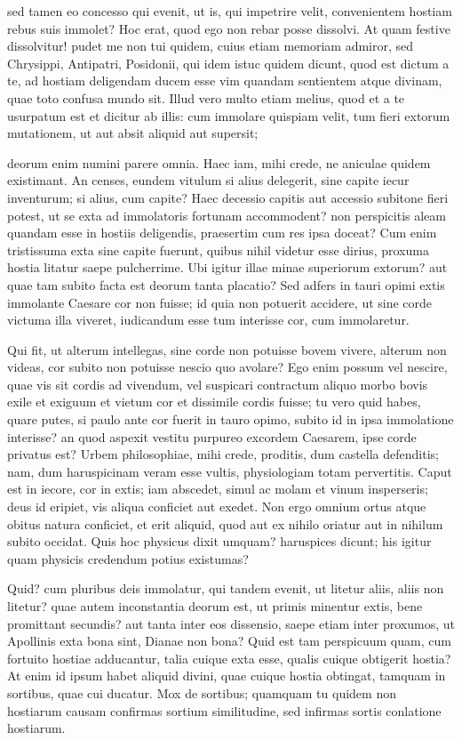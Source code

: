  sed tamen eo concesso qui evenit, ut is, qui impetrire velit, convenientem hostiam rebus suis immolet? Hoc erat, quod ego non rebar posse dissolvi. At quam festive dissolvitur! pudet me non tui quidem, cuius etiam memoriam admiror, sed Chrysippi, Antipatri, Posidonii, qui idem istuc quidem dicunt, quod est dictum a te, ad hostiam deligendam ducem esse vim quandam sentientem atque divinam, quae toto confusa mundo sit. Illud vero multo etiam melius, quod et a te usurpatum est et dicitur ab illis: cum immolare quispiam velit, tum fieri extorum mutationem, ut aut absit aliquid aut supersit;

 deorum enim numini parere omnia. Haec iam, mihi crede, ne aniculae quidem existimant. An censes, eundem vitulum si alius delegerit, sine capite iecur inventurum; si alius, cum capite? Haec decessio capitis aut accessio subitone fieri potest, ut se exta ad immolatoris fortunam accommodent? non perspicitis aleam quandam esse in hostiis deligendis, praesertim cum res ipsa doceat? Cum enim tristissuma exta sine capite fuerunt, quibus nihil videtur esse dirius, proxuma hostia litatur saepe pulcherrime. Ubi igitur illae minae superiorum extorum? aut quae tam subito facta est deorum tanta placatio? Sed adfers in tauri opimi extis immolante Caesare cor non fuisse; id quia non potuerit accidere, ut sine corde victuma illa viveret, iudicandum esse tum interisse cor, cum immolaretur.

 Qui fit, ut alterum intellegas, sine corde non potuisse bovem vivere, alterum non videas, cor subito non potuisse nescio quo avolare? Ego enim possum vel nescire, quae vis sit cordis ad vivendum, vel suspicari contractum aliquo morbo bovis exile et exiguum et vietum cor et dissimile cordis fuisse; tu vero quid habes, quare putes, si paulo ante cor fuerit in tauro opimo, subito id in ipsa immolatione interisse? an quod aspexit vestitu purpureo excordem Caesarem, ipse corde privatus est? Urbem philosophiae, mihi crede, proditis, dum castella defenditis; nam, dum haruspicinam veram esse vultis, physiologiam totam pervertitis. Caput est in iecore, cor in extis; iam abscedet, simul ac molam et vinum insperseris; deus id eripiet, vis aliqua conficiet aut exedet. Non ergo omnium ortus atque obitus natura conficiet, et erit aliquid, quod aut ex nihilo oriatur aut in nihilum subito occidat. Quis hoc physicus dixit umquam? haruspices dicunt; his igitur quam physicis credendum potius existumas?

 Quid? cum pluribus deis immolatur, qui tandem evenit, ut litetur aliis, aliis non litetur? quae autem inconstantia deorum est, ut primis minentur extis, bene promittant secundis? aut tanta inter eos dissensio, saepe etiam inter proxumos, ut Apollinis exta bona sint, Dianae non bona? Quid est tam perspicuum quam, cum fortuito hostiae adducantur, talia cuique exta esse, qualis cuique obtigerit hostia? At enim id ipsum habet aliquid divini, quae cuique hostia obtingat, tamquam in sortibus, quae cui ducatur. Mox de sortibus; quamquam tu quidem non hostiarum causam confirmas sortium similitudine, sed infirmas sortis conlatione hostiarum.

